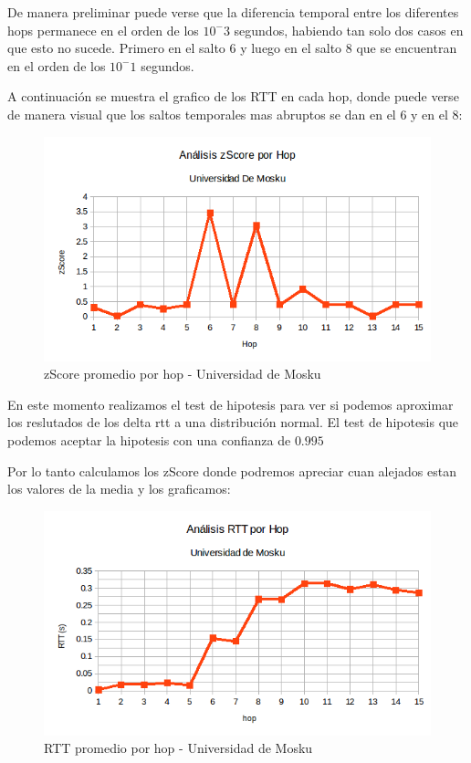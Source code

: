 De manera preliminar puede verse que la diferencia temporal entre los diferentes hops permanece en el orden de los $10^-3$ segundos, habiendo tan solo dos casos en que esto no sucede. Primero en el salto $6$ y luego en el salto $8$ que se encuentran en el orden de los $10^-1$ segundos.

A continuación se muestra el grafico de los RTT en cada hop, donde puede verse de manera visual que los saltos temporales mas abruptos se dan en el 6 y en el 8:

\bigskip

\begin{figure}[H]
\centering
\includegraphics[width=1\textwidth]{graficos/zScore_rus.png}
\caption{zScore promedio por hop - Universidad de Mosku}
\label{Rus_zs}
\end{figure}

En este momento realizamos el test de hipotesis para ver si podemos aproximar los reslutados de los delta rtt a una distribución normal. El test de hipotesis que podemos aceptar la hipotesis con una confianza de $0.995$

Por lo tanto calculamos los zScore donde podremos apreciar cuan alejados estan los valores de la media y los graficamos:

\begin{figure}[H]
\centering
\includegraphics[width=1\textwidth]{graficos/RTT_rus.png}
\caption{RTT promedio por hop - Universidad de Mosku}
\label{Rus_rtt}
\end{figure}

